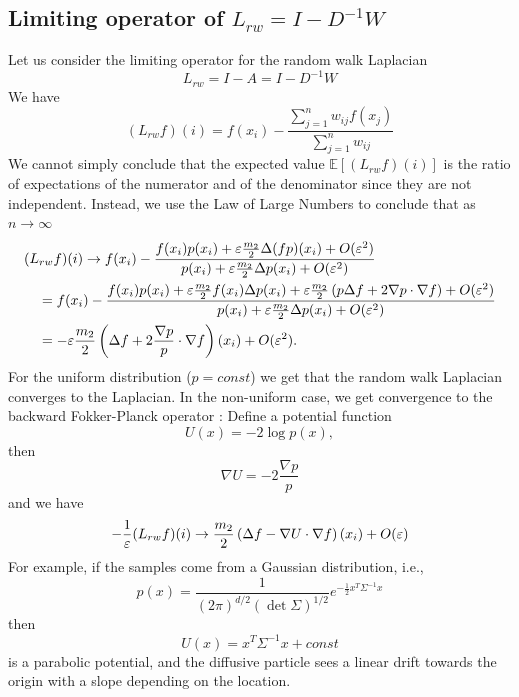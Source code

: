 \subsection{Limiting operator of $L_{rw}=I - D^{-1}W$}
Let us consider the limiting operator for the random walk Laplacian $$L_{rw} = I - A = I - D^{-1}W$$ We have
$$(L_{rw}f)(i) = f(x_i) - \frac{\sum_{j=1}^n w_{ij}f(x_j)}{\sum_{j=1}^n w_{ij}}$$
We cannot simply conclude that the expected value $\mathbb{E}[(L_{rw}f)(i)]$ is the ratio of expectations of the numerator and of the denominator since they are not independent. Instead, we use the Law of Large Numbers to conclude that as $n\to \infty$
\begin{align*}
& (L_{rw}f)(i) \to f(x_i) - \frac{f(x_i)p(x_i) + \varepsilon\frac{m_2}{2}\Delta(fp)(x_i) + O(\varepsilon^2)}{p(x_i) + \varepsilon\frac{m_2}{2}\Delta p(x_i) + O(\varepsilon^2)} \\
& \quad = f(x_i) - \frac{f(x_i)p(x_i) + \varepsilon\frac{m_2}{2}f(x_i)\Delta p(x_i) + \varepsilon\frac{m_2}{2}\left(p \Delta f + 2\nabla p \cdot \nabla f \right) + O(\varepsilon^2)}{p(x_i) + \varepsilon\frac{m_2}{2}\Delta p(x_i) + O(\varepsilon^2)} \\
& \quad = -\varepsilon\frac{m_2}{2}\left(\Delta f + 2\frac{\nabla p}{p}\cdot \nabla f \right)(x_i) + O(\varepsilon^2).
\end{align*}
For the uniform distribution ($p=const$) we get that the random walk Laplacian converges to the Laplacian. In the non-uniform case, we get convergence to the backward Fokker-Planck operator \cite{nadler2006diffusion}: Define a potential function $$U(x) = -2\log p(x),$$ then $$\nabla U = -2\frac{\nabla p}{p}$$ and we have
$$-\frac{1}{\varepsilon}(L_{rw}f)(i) \to \frac{m_2}{2}\left(\Delta f - \nabla U \cdot \nabla f\right)(x_i) + O(\varepsilon)$$
For example, if the samples come from a Gaussian distribution, i.e., $$p(x) = \frac{1}{(2\pi)^{d/2} (\det \Sigma)^{1/2}} e^{-\frac{1}{2}x^T \Sigma^{-1} x}$$ then $$U(x)=x^T\Sigma^{-1}x + const$$ is a parabolic potential, and the diffusive particle sees a linear drift towards the origin with a slope depending on the location.



